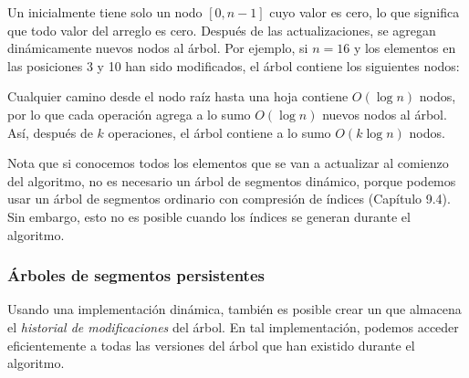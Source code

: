 Un  inicialmente tiene
solo un nodo $[0,n-1]$ cuyo valor es cero,
lo que significa que todo valor del arreglo es cero.
Después de las actualizaciones, se agregan dinámicamente nuevos nodos
al árbol.
Por ejemplo, si $n=16$ y los elementos
en las posiciones 3 y 10 han sido modificados,
el árbol contiene los siguientes nodos:
\begin{center}
\end{center}

Cualquier camino desde el nodo raíz hasta una hoja contiene
$O(\log n)$ nodos,
por lo que cada operación agrega a lo sumo $O(\log n)$
nuevos nodos al árbol.
Así, después de $k$ operaciones, el árbol contiene
a lo sumo $O(k \log n)$ nodos.

Nota que si conocemos todos los elementos que se van a actualizar
al comienzo del algoritmo,
no es necesario un árbol de segmentos dinámico,
porque podemos usar un árbol de segmentos ordinario con
compresión de índices (Capítulo 9.4).
Sin embargo, esto no es posible cuando los índices
se generan durante el algoritmo.

\subsubsection{Árboles de segmentos persistentes}


Usando una implementación dinámica,
también es posible crear un
 que almacena
el \emph{historial de modificaciones} del árbol.
En tal implementación, podemos
acceder eficientemente a
todas las versiones del árbol que han
existido durante el algoritmo.

